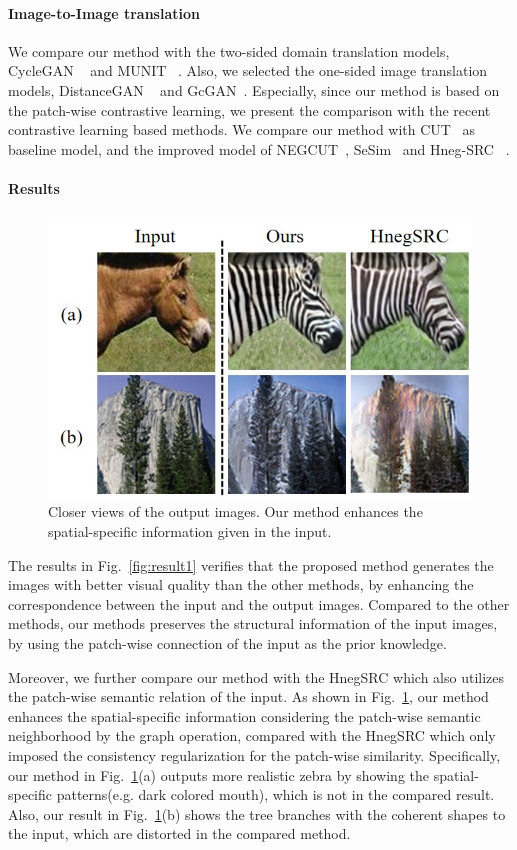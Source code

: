 \documentclass[letterpaper]{article} %
\begin{document}
\paragraph{Image-to-Image translation}



We compare our method with the two-sided domain translation models, CycleGAN ~\cite{cyclegan} and MUNIT ~\cite{munit}. Also, we selected the one-sided image translation models, DistanceGAN ~\cite{distancegan} and GcGAN~\cite{gcgan}.
Especially, since our method is based on the patch-wise contrastive learning, we present the comparison with the recent contrastive learning based methods. We compare our method with CUT~\cite{cut} as baseline model, and the improved model of NEGCUT~\cite{negcut}, SeSim~\cite{sesim} and Hneg-SRC ~\cite{HnegSRC}.

\paragraph{Results}
\begin{figure}[!t]
	\centering
	\includegraphics[width=0.85\columnwidth]{figs/spatial_specific_2.jpg}
	\caption{Closer views of the output images. Our method enhances the spatial-specific information given in the input.}
	\label{fig:spatial_specific}
\end{figure}


The results in Fig.~\ref{fig:result1} verifies that the proposed method generates the images with better visual quality than the other methods, by enhancing the correspondence between the input and the output images. Compared to the other methods, our methods preserves the structural information of the input images, by using the patch-wise connection of the input as the prior knowledge.

Moreover, we further compare our method with the HnegSRC which also utilizes the patch-wise semantic relation of the input. As shown in Fig.~\ref{fig:spatial_specific}, our method enhances the spatial-specific information considering the patch-wise semantic neighborhood by the graph operation, compared with the HnegSRC which only imposed the consistency regularization for the patch-wise similarity. Specifically, our method in Fig.~\ref{fig:spatial_specific}(a) outputs more realistic zebra by showing the spatial-specific patterns(e.g. dark colored mouth), which is not in the compared result. Also, our result in Fig.~\ref{fig:spatial_specific}(b) shows the tree branches with the coherent shapes to the input, which are distorted in the compared method.
\end{document}
